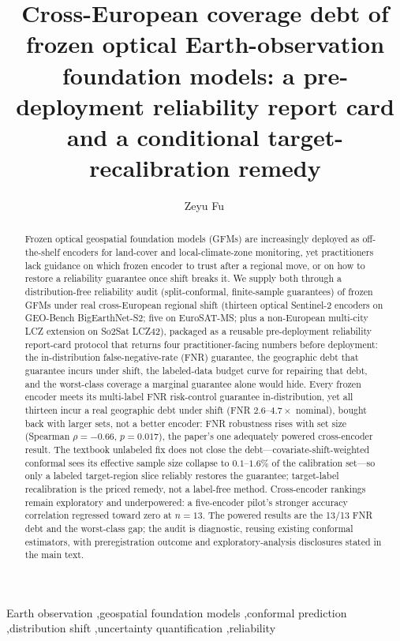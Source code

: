 \documentclass[preprint,11pt,authoryear]{elsarticle}
\begin{document}
\begin{frontmatter}

\title{Cross-European coverage debt of frozen optical Earth-observation foundation models:
a pre-deployment reliability report card and a conditional target-recalibration remedy}

\author[amui]{Zeyu Fu\,}
\address[amui]{State Key Laboratory of Trauma and Chemical Poisoning, Institute of Combined Injury, Army
    Medical University, Chongqing, China}

\begin{abstract}
Frozen optical geospatial foundation models (GFMs) are increasingly deployed as off-the-shelf encoders for
land-cover and local-climate-zone monitoring, yet practitioners lack guidance on which frozen
encoder to trust after a regional move, or on how to restore a reliability guarantee once shift breaks
it. We supply both through a distribution-free reliability audit (split-conformal, finite-sample
guarantees) of frozen GFMs under real cross-European regional shift (thirteen optical Sentinel-2 encoders on GEO-Bench BigEarthNet-S2;
five on EuroSAT-MS; plus a non-European multi-city LCZ extension on So2Sat LCZ42), packaged as a reusable pre-deployment reliability report-card protocol
that returns four practitioner-facing numbers before
deployment: the in-distribution false-negative-rate (FNR) guarantee, the geographic debt that guarantee incurs under shift,
the labeled-data budget curve for repairing that debt, and the worst-class coverage a
marginal guarantee alone would hide. Every frozen encoder meets its multi-label FNR risk-control guarantee
in-distribution, yet all thirteen incur a real geographic debt under shift (FNR $2.6$--$4.7\times$
nominal), bought back with larger sets, not a better encoder: FNR robustness rises with set size (Spearman
$\rho=-0.66$, $p{=}0.017$), the paper's one adequately powered cross-encoder result. The textbook
unlabeled fix does not close the debt---covariate-shift-weighted conformal sees its
effective sample size collapse to $0.1$--$1.6\%$ of the calibration set---so only a labeled
target-region slice reliably restores the guarantee; target-label recalibration is the priced remedy, not a label-free method. Cross-encoder rankings remain exploratory and underpowered: a five-encoder pilot's stronger accuracy correlation regressed toward zero at $n{=}13$.
The powered results are the 13/13 FNR debt and the worst-class gap; the audit is diagnostic, reusing existing
conformal estimators, with preregistration outcome and exploratory-analysis disclosures stated in the main text.
\end{abstract}

\begin{keyword}
Earth observation \sep geospatial foundation models \sep conformal prediction \sep distribution shift \sep uncertainty quantification \sep reliability
\end{keyword}

\end{frontmatter}
\end{document}

